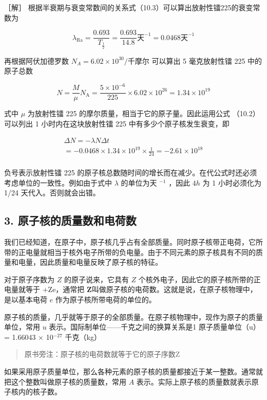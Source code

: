 ［解］
根据半衰期与衰变常数间的关系式（10.3）可以算出放射性镭225的衰变常数为

\[
\lambda_ {\mathrm{Ra}} = \frac {0.693}{T _ {\frac {1}{2}}} = \frac {0.693}{14.8} \text{天} ^ {- 1} = 0.0468 \text{天} ^ {- 1}
\]

再根据阿伏加德罗数 \(N_{A}=6.02\times10^{30}/\text{千摩尔}\) 可以算出 5
毫克放射性镭 225 中的原子总数

\[
N = \frac {M}{\mu} N _ {\mathrm{A}} = \frac {5 \times 10 ^ {- 6}}{225} \times 6.02 \times 10 ^ {26} = 1.34 \times 10 ^ {19}
\]

式中 \(\mu\) 为放射性镭 225 的摩尔质量，相当于它的原子量。因此运用公式
（10.2） 可以列出 1 小时内在这块放射性镭 225
中有多少个原子核发生衰变，即

\[
\begin{array}{l} \Delta N = - \lambda N \Delta t \\ = - 0.0468 \times 1.34 \times 10 ^ {19} \times \frac {1}{24} = - 2.61 \times 10 ^ {18} \\ \end{array}
\]

负号表示放射性镭 225
的原子核总数随时间的增长而在减少。在代公式时还必须考虑单位的一致性。例如由于式中
\(\lambda\) 的单位为天 \(^{-1}\) ，因此 \(4h\) 为 1 小时必须化为 1/24
天代入。否则就会出错。

\subsection{3.
原子核的质量数和电荷数}

我们已经知道，在原子中，原子核几乎占有全部质量。同时原子核带正电荷，它所带的正电量就相当于核外电子所带的负电量。由于不同元素的原子核具有不同的质量和电量，因此质量和电量反映了原子核的特征。

对于原子序数为 \(Z\) 的原子说来，它具有 \(Z\)
个核外电子，因此它的原子核所带的正电量就等于 \(+\mathrm{Ze}\)，通常把
\(\mathbf{Z}\)叫做原子核的电荷数。这就是说，在原子核物理中，是以基本电荷
\(e\) 作为原子核所带电荷的单位的。

原子核的质量，几乎就等于原子的全部质量。在原子核物理中，现作为原子的质量单位，常用
\(u\) 表示。国际制单位------千克之间的换算关系是1 原子质量单位（u） =
1.66043 × 10\(^{-27}\) 千克（kg）

\begin{quote}
原书旁注：原子核的电荷数就等于它的原子序数Z
\end{quote}

如果采用原子质量单位，那么各种元素的原子核的质量都接近于某一整数。通常就把这个整数叫做原子核的质量数，常用
\(A\) 表示。实际上原子核的质量数就表示原子核内的核子数。

